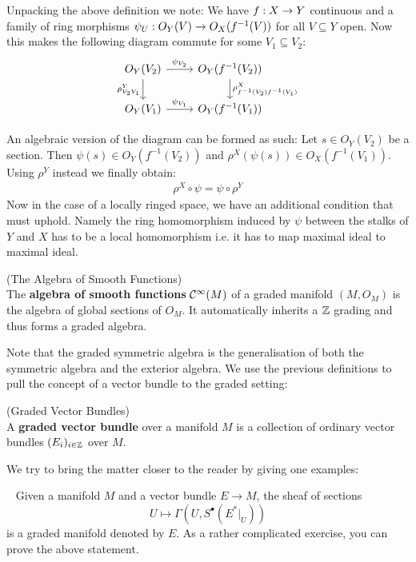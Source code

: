 Unpacking the above definition we note: We have $f:X \rightarrow Y$ continuous and a family of ring morphisms $\psi_U: O_Y(V) \rightarrow O_X(f^{-1}(V))$ for all $V\subseteq Y$ open. Now this makes the following diagram commute for some $V_1 \subseteq V_2$:
\[
\begin{tikzcd}
  O_Y(V_2) \arrow{r}{\psi_{V_2}} \arrow[swap]{d}{\rho^Y_{V_2 V_1}} & O_Y(f^{-1}(V_2)) \arrow{d}{\rho^X_{f^{-1}(V_2) f^{-1}(V_1)}} \\
  O_Y(V_1) \arrow{r}{\psi_{V_1}} & O_Y(f^{-1}(V_1))
\end{tikzcd}
\]

An algebraic version of the diagram can be formed as such: Let $s\in O_Y(V_2)$ be a section. Then $\psi(s) \in O_Y(f^{-1}(V_2))$ and $\rho^X(\psi(s)) \in O_X(f^{-1}(V_1))$. Using $\rho^Y$ instead we finally obtain:
\begin{align}
  \rho^X \circ \psi = \psi \circ \rho^Y
\end{align}
Now in the case of a locally ringed space, we have an additional condition that must uphold. Namely the ring homomorphism induced by $\psi$ between the stalks of $Y$ and $X$ has to be a local homomorphism i.e. it has to map maximal ideal to maximal ideal.

\begin{definition} (The Algebra of Smooth Functions)\\
  The \textbf{algebra of smooth functions} $\mathcal{C}^{\infty}(M)$ of a graded manifold $(M, O_M)$ is the algebra of global sections of $O_M$. It automatically inherits a $\mathbb{Z}$ grading and thus forms a graded algebra.
\end{definition}

Note that the graded symmetric algebra is the generalisation of both the symmetric algebra and the exterior algebra. We use the previous definitions to pull the concept of a vector bundle to the graded setting:

\begin{definition} (Graded Vector Bundles)\\
  A \textbf{graded vector bundle} over a manifold $M$ is a collection of ordinary vector bundles $(E_i)_{i\in \mathbb{Z}}$ over $M$.
\end{definition}

We try to bring the matter closer to the reader by giving one examples:

\begin{example}~
\label{Sheaf_of_sections}
  Given a manifold $M$ and a vector bundle $E\longrightarrow M$, the sheaf of sections
  $$ U \mapsto \Gamma(U, S^\bullet(E^*|_U)) $$
  is a graded manifold denoted by $E$. As a rather complicated exercise, you can prove the above statement.
\end{example}

